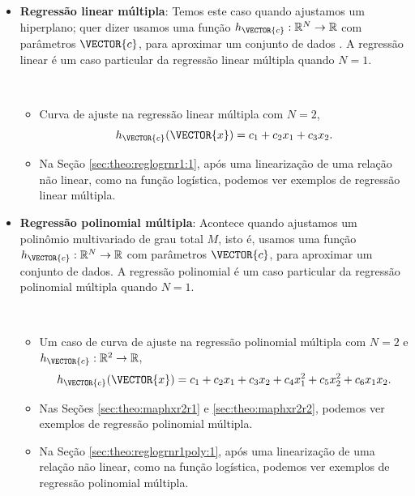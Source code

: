 \begin{itemize}
\item \textbf{Regressão linear múltipla}:
Temos este caso quando ajustamos um hiperplano;
quer dizer usamos uma função $h_{\VECTOR{c}}:\mathbb{R}^{N} \rightarrow \mathbb{R}$ com parâmetros $\VECTOR{c}$, 
para aproximar um conjunto de dados \cite[pp. 399, 418]{chapra2016metodos}.
A regressão linear é um caso particular da regressão linear múltipla quando $N=1$.
\begin{example}~
\begin{itemize}
\item Curva de ajuste na regressão linear múltipla com $N=2$, 
\begin{equation}
h_{\VECTOR{c}}(\VECTOR{x})=c_1+c_2 x_1+c_3 x_2.
\end{equation}
\item Na Seção \ref{sec:theo:reglogrnr1:1}, após uma linearização de uma relação não linear,
como na função logística, podemos ver exemplos de regressão linear múltipla.
\end{itemize}
\end{example}

\item \textbf{Regressão polinomial múltipla}:
Acontece quando ajustamos um polinômio multivariado de grau total $M$,
isto é, usamos uma função $h_{\VECTOR{c}}:\mathbb{R}^{N} \rightarrow \mathbb{R}$ com parâmetros $\VECTOR{c}$, 
para aproximar um conjunto de dados.
A regressão polinomial é um caso particular da regressão polinomial múltipla quando $N=1$.
\begin{example}~
\begin{itemize}
\item Um caso de curva de ajuste na regressão polinomial múltipla com 
$N=2$ e $h_{\VECTOR{c}}:\mathbb{R}^{2} \rightarrow \mathbb{R}$, 
\begin{equation}
h_{\VECTOR{c}}(\VECTOR{x})=c_1+c_2 x_1+c_3 x_2+c_4 x_1^2+c_5 x_2^2+c_6 x_1 x_2.
\end{equation}
\item Nas Seções \ref{sec:theo:maphxr2r1} e \ref{sec:theo:maphxr2r2},
 podemos ver exemplos de regressão polinomial múltipla.
\item Na Seção \ref{sec:theo:reglogrnr1poly:1}, após uma linearização de uma relação não linear,
como na função logística, podemos ver exemplos de regressão polinomial múltipla.
\end{itemize}
\end{example}


\end{itemize}
